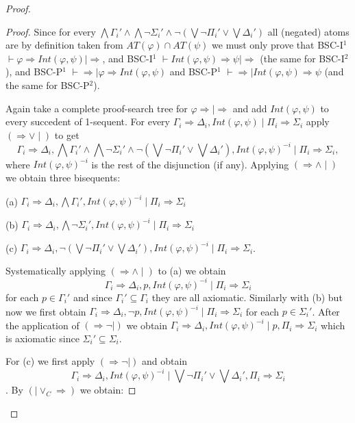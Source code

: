 \documentclass[10pt,a4paper]{article}
\theoremstyle{definition}
\newcommand{\3}{\vspace{.3in}}
\newcommand{\2}{\vspace{.2in}}
\newcommand{\1}{\vspace{.1in}}
\newcommand{\5}{\vspace{.05in}}
\begin{document}
\begin{proof}
\begin{proof}
Since for every $\bigwedge\Gamma_i'\wedge \bigwedge\neg\Sigma_i'\wedge \neg(\bigvee\neg\Pi_i'\vee\bigvee\Delta_i')$ all (negated) atoms are by definition taken from  $AT(\varphi)\cap AT(\psi)$ we must
only prove that BSC-I$^1$ $\vdash\varphi\Rightarrow Int(\varphi, \psi)\mid\Rightarrow$, and BSC-I$^1$ $\vdash Int(\varphi, \psi) \Rightarrow\psi\mid\Rightarrow$ (the same for BSC-I$^2$), and BSC-P$^1$ $\vdash\Rightarrow\mid\varphi\Rightarrow Int(\varphi, \psi)$ and BSC-P$^1$ $\vdash \Rightarrow \mid Int(\varphi, \psi) \Rightarrow\psi$ (and the same for BSC-P$^2$). 

Again take a complete proof-search tree for $\varphi\Rightarrow\mid\Rightarrow$ and add $Int(\varphi, \psi)$ to every succedent of 1-sequent. For every $\Gamma_i\Rightarrow\Delta_i, Int(\varphi, \psi)\mid\Pi_i\Rightarrow\Sigma_i$
apply $(\Rightarrow\vee\mid)$ to get $$\Gamma_i\Rightarrow\Delta_i, \bigwedge\Gamma_i'\wedge \bigwedge\neg\Sigma_i'\wedge \neg(\bigvee\neg\Pi_i'\vee\bigvee\Delta_i'), Int(\varphi, \psi)^{-i}\mid\Pi_i\Rightarrow\Sigma_i,$$ where $Int(\varphi, \psi)^{-i}$
is the rest of the disjunction (if any). Applying $(\Rightarrow\wedge\mid)$  we obtain three bisequents:

\1

(a) $\Gamma_i\Rightarrow\Delta_i, \bigwedge\Gamma_i', Int(\varphi, \psi)^{-i}\mid\Pi_i\Rightarrow\Sigma_i$

(b) $\Gamma_i\Rightarrow\Delta_i, \bigwedge\neg\Sigma_i', Int(\varphi, \psi)^{-i}\mid\Pi_i\Rightarrow\Sigma_i$

(c) $\Gamma_i\Rightarrow\Delta_i, \neg(\bigvee\neg\Pi_i'\vee\bigvee\Delta_i'), Int(\varphi, \psi)^{-i}\mid\Pi_i\Rightarrow\Sigma_i$.

\1

Systematically applying $(\Rightarrow\wedge\mid)$  to (a) we obtain 
$$\Gamma_i\Rightarrow\Delta_i, p, Int(\varphi, \psi)^{-i}\mid\Pi_i\Rightarrow\Sigma_i$$ for each $p\in \Gamma_i'$ and since $\Gamma_i'\subseteq\Gamma_i$ they are all axiomatic. Similarly with (b) but now we first obtain $\Gamma_i\Rightarrow\Delta_i, \neg p, Int(\varphi, \psi)^{-i}\mid\Pi_i\Rightarrow\Sigma_i$ for each $p\in \Sigma_i'$. After the application of $(\Rightarrow\neg\mid)$ we obtain $\Gamma_i\Rightarrow\Delta_i, Int(\varphi, \psi)^{-i}\mid p, \Pi_i\Rightarrow\Sigma_i$ which is axiomatic since $\Sigma_i'\subseteq\Sigma_i$.

For (c) we first apply $(\Rightarrow\neg\mid)$ and obtain $$\Gamma_i\Rightarrow\Delta_i, Int(\varphi, \psi)^{-i}\mid \bigvee\neg\Pi_i'\vee\bigvee\Delta_i', \Pi_i\Rightarrow\Sigma_i$$. By $(\mid\vee_C\Rightarrow)$ we obtain:


\end{proof}
\end{proof}
\end{document}
